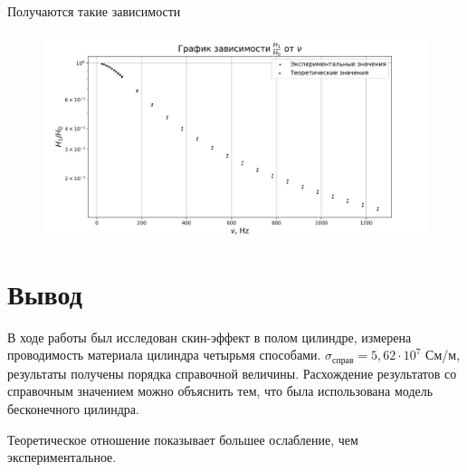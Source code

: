 \documentclass[a4paper,12pt]{article}
\begin{document}
Получаются такие зависимости
\begin{figure}[H]
	\begin{center}	\includegraphics[width=1\textwidth]{graphik6.jpg}
	\end{center}
\end{figure}

\section{Вывод}
В ходе работы был исследован скин-эффект в полом цилиндре, измерена проводимость материала цилиндра четырьмя способами. $\sigma_{\text{справ}} = 5,62 \cdot 10^7$ См/м, результаты получены порядка справочной величины. Расхождение результатов со справочным значением можно объяснить тем, что была использована модель бесконечного цилиндра.

Теоретическое отношение показывает большее ослабление, чем экспериментальное.
\end{document}

